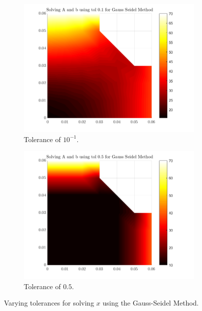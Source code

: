 \documentclass[12pt,a4paper]{article}
\begin{document}
\begin{figure}[H]
\begin{subfigure}[b]{0.48\textwidth}
		\includegraphics[width=\linewidth]{images/GaussComparisontol0-1.png}
		\caption{Tolerance of $10^{-1}$.}
		\label{fig:tol0.1}
	\end{subfigure}
	\hfill
	\begin{subfigure}[b]{0.48\textwidth}
		\centering
		\includegraphics[width=\linewidth]{images/GaussComparisontol0-5.png}
		\caption{Tolerance of $0.5$.}
		\label{fig:Gausstol0.5}
	\end{subfigure}
	\caption{Varying tolerances for solving $x$ using the Gauss-Seidel Method.}
    \label{fig:Gausstolerance}
\end{figure}
\end{document}

